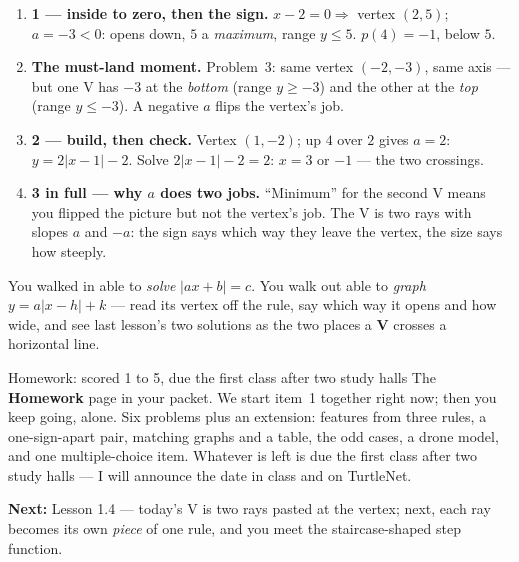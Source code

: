 \documentclass[aspectratio=169, 11pt]{beamer}
\begin{document}
\begin{frame}[t, plain]
  \begin{enumerate}\setlength{\itemsep}{5pt}
    \item \textbf{1 --- inside to zero, then the sign.} $x-2=0 \Rightarrow$ vertex $(2,5)$;
          $a=-3<0$: opens down, $5$ a \emph{maximum}, range $y\le5$. $p(4)=-1$, below $5$. \checkmark
    \item \textbf{The must-land moment.} Problem~3: same vertex $(-2,-3)$, same axis --- but one
          V has $-3$ at the \emph{bottom} (range $y\ge-3$) and the other at the \emph{top}
          (range $y\le-3$). A negative $a$ flips the vertex's job.
    \item \textbf{2 --- build, then check.} Vertex $(1,-2)$; up $4$ over $2$ gives $a=2$:
          $y=2|x-1|-2$. Solve $2|x-1|-2=2$: $x=3$ or $-1$ --- the two crossings. \checkmark
    \item \textbf{3 in full --- why $a$ does two jobs.} ``Minimum'' for the second V means you
          flipped the picture but not the vertex's job. The V is two rays with slopes $a$ and
          $-a$: the sign says which way they leave the vertex, the size says how steeply.
  \end{enumerate}
\end{frame}

\begin{frame}[t, plain]
  You walked in able to \emph{solve} $|ax+b|=c$. You walk out able to \emph{graph} $y=a|x-h|+k$
  --- read its vertex off the rule, say which way it opens and how wide, and see last lesson's two
  solutions as the two places a \textbf{V} crosses a horizontal line.
  \vspace{5pt}
  \begin{block}{Homework: scored 1 to 5, due the first class after two study halls}
    The \textbf{Homework} page in your packet. We start item~1 together right now; then you keep
    going, alone. Six problems plus an extension: features from three rules, a one-sign-apart
    pair, matching graphs and a table, the odd cases, a drone model, and one multiple-choice item.
    Whatever is left is due the first class after two study halls --- I will announce the date in
    class and on TurtleNet.
  \end{block}
  \vspace{4pt}
  \textbf{Next:} Lesson 1.4 --- today's V is two rays pasted at the vertex; next, each ray becomes
  its own \emph{piece} of one rule, and you meet the staircase-shaped step function.
\end{frame}
\end{document}
